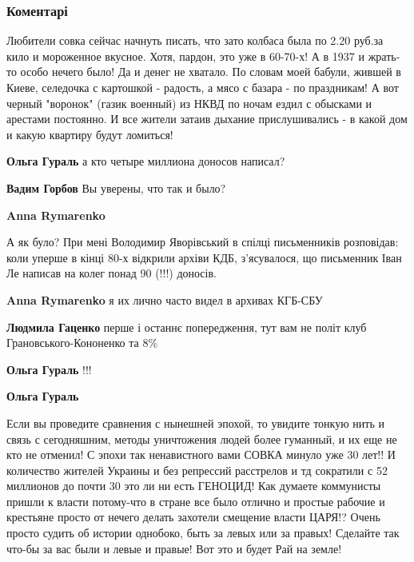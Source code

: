 
 
 
 
 
\subsubsection{Коментарі}

\begin{itemize} %

Любители совка сейчас начнуть писать, что зато колбаса была по 2.20 руб.за кило
и мороженное вкусное. Хотя, пардон, это уже в 60-70-х! А в 1937 и жрать-то
особо нечего было! Да и денег не хватало. По словам моей бабули, жившей в
Киеве, селедочка с картошкой - радость, а мясо с базара - по праздникам! А вот
черный "воронок" (газик военный) из НКВД по ночам ездил с обысками и арестами
постоянно. И все жители затаив дыхание прислушивались - в какой дом и какую
квартиру будут ломиться!

\begin{itemize} %
\textbf{Ольга Гураль} а кто четыре миллиона доносов написал?

\begin{itemize} %
\textbf{Вадим Горбов} Вы уверены, что так и было?

\textbf{Anna Rymarenko} 

А як було? При мені Володимир Яворівський в спілці письменників розповідав:
коли уперше в кінці 80-х відкрили архіви КДБ, з'ясувалося, що письменник Іван
Ле написав на колег понад 90 (!!!) доносів.

\textbf{Anna Rymarenko} я их лично часто видел в архивах КГБ-СБУ

\textbf{Людмила Гаценко} перше і останнє попередження, тут вам не політ клуб Грановського-Кононенко та 8\%
\end{itemize} %

\textbf{Ольга Гураль} !!!

\textbf{Ольга Гураль} 

Если вы проведите сравнения с нынешней эпохой, то увидите тонкую нить и связь с
сегодняшним, методы уничтожения людей более гуманный, и их еще не кто не
отменил! С эпохи так ненавистного вами СОВКА минуло уже 30 лет!! И количество
жителей Украины и без репрессий расстрелов и тд сократили с 52 миллионов до
почти 30 это ли ни есть ГЕНОЦИД! Как думаете коммунисты пришли к власти
потому-что в стране все было отлично и простые рабочие и крестьяне просто от
нечего делать захотели смещение власти ЦАРЯ!? Очень просто судить об истории
однобоко, быть за левых или за правых! Сделайте так что-бы за вас были и левые
и правые! Вот это и будет Рай на земле!


\end{itemize}
\end{itemize}
